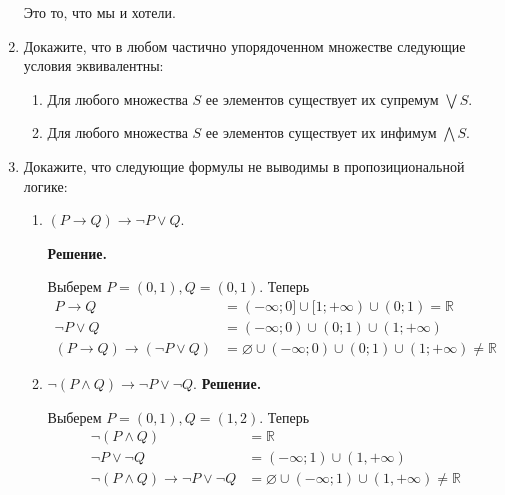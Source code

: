 \begin{enumerate}
    Это то, что мы и хотели.

\item Докажите, что в любом частично упорядоченном множестве следующие условия эквивалентны:
\begin{enumerate}
\item Для любого множества $S$ ее элементов существует их супремум $\bigvee S$.
\item Для любого множества $S$ ее элементов существует их инфимум $\bigwedge S$.
\end{enumerate} 

\item Докажите, что следующие формулы не выводимы в пропозициональной логике:
\begin{enumerate}
\item $(P \to Q) \to \neg P \lor Q$.

	\textbf{Решение.}
	
	Выберем $P = (0, 1), Q = (0, 1)$. Теперь 
	\begin{align*}
		P \to Q &= (-\infty; 0] \cup [1; +\infty) \cup (0; 1) = \mathbb{R} \\
		\neg P \lor Q &= (-\infty; 0) \cup (0; 1) \cup (1; +\infty) \\
		(P \to Q) \to (\neg P \lor Q) &= \varnothing \cup (-\infty; 0) \cup (0; 1) \cup (1; +\infty) \neq 
		\mathbb{R}
	\end{align*}
\item $\neg (P \land Q) \to \neg P \lor \neg Q$.
	\textbf{Решение.}
	
	Выберем $P = (0, 1), Q = (1, 2)$. Теперь
	\begin{align*}
		\neg (P \land Q) &= \mathbb{R} \\
		\neg P \lor \neg Q &= (-\infty; 1) \cup (1, +\infty) \\
		\neg (P \land Q) \to \neg P \lor \neg Q &= \varnothing \cup (-\infty; 1) \cup (1, +\infty) \neq \mathbb{R}
	\end{align*}

\end{enumerate}

\end{enumerate}
